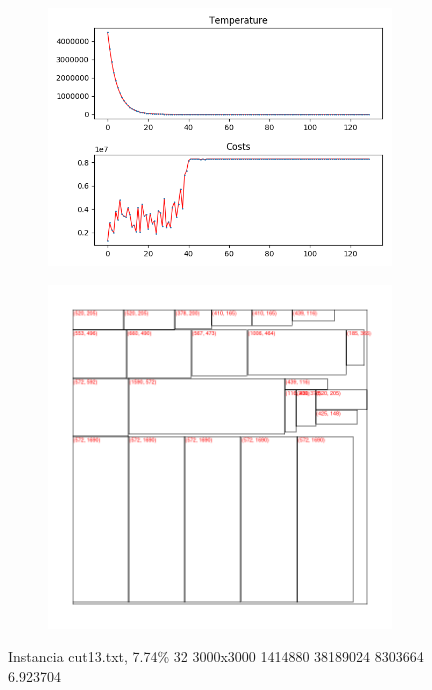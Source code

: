 \begin{figure}
\centering
\begin{subfigure}{.5\textwidth}
  \centering
  \includegraphics[width=1\linewidth]{results/cut13/1/plot}
  \label{fig:sub1}
\end{subfigure}%
\begin{subfigure}{.5\textwidth}
  \centering
  \includegraphics[width=1\linewidth]{results/cut13/1/cut}
  \label{fig:sub2}
\end{subfigure}
\caption{Instancia cut13.txt, 7.74\% 32 3000x3000 1414880 38189024 8303664 6.923704}
\label{fig:test}
\end{figure}


